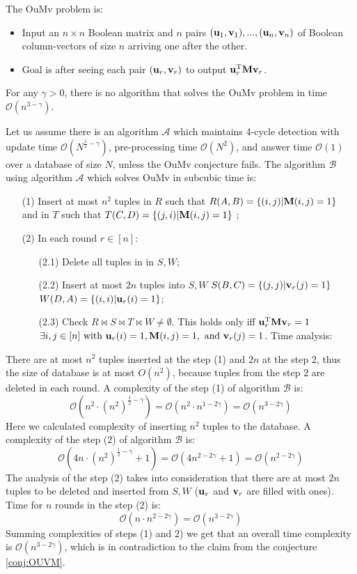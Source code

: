 \documentclass[10pt,a4paper]{article}
\begin{document}
\begin{enumerate}
The OuMv problem is:
\begin{itemize}
\item 
Input an $n \times n$ Boolean matrix  and $n$ pairs $(\textbf{\text{{u}}}_1, \textbf{\text{{v}}}_1), ..., (\textbf{\text{{u}}}_n, \textbf{\text{{v}}}_n)$ of Boolean column-vectors of size $n$ arriving one after the other. 
\item 
	Goal is after seeing each pair $(\textbf{\text{{u}}}_r, \textbf{\text{{v}}}_r)$ to output $\textbf{\text{{u}}}_r ^ \text{T}\textbf{\text{{M}}}\textbf{\text{{v}}}_r$.
\end{itemize}
\begin{conjecture}\label{conj:OUVM}
For any $\gamma > 0$, there is no algorithm that solves the OuMv problem in time $\mathcal{O}(n^{3-\gamma})$.
\end{conjecture}
Let us assume there is an algorithm $\mathcal{A}$ which maintains 4-cycle detection with update time $\mathcal{O}(N^{\frac{1}{2}-\gamma})$, pre-processing time $\mathcal{O}(N^2)$, and answer time $\mathcal{O}(1)$ over a database of size $N$, unless the OuMv conjecture fails. 
The algorithm  $\mathcal{B}$ using algorithm $\mathcal{A}$ which solves OuMv in subcubic time is:
\begin{itemize}
\item[(1)] 
Insert at most $n^2$ tuples in $R$ such that $R(A, B) = \{(i, j) | \textbf{\text{{M}}}(i, j) = 1\}$ and in $T$ such that $T(C, D) = \{(j, i) | \textbf{\text{{M}}}(i, j) = 1\}$ ;
\item[(2)] In each round $r \in [n]$:
\begin{itemize}
\item[(2.1)] Delete all tuples in in $S, W$;
\item[(2.2)]  Insert at most $2n$ tuples into $S,  W$ 
$S(B, C) = \{(j, j) | \textbf{\text{{v}}}_r(j) = 1\}$
$W(D, A) = \{(i, i) | \textbf{\text{{u}}}_r(i) = 1\}$;
\item[(2.3)] Check $R \bowtie S \bowtie T \bowtie W \neq \emptyset$. This holds only iff $\textbf{\text{{u}}} ^ \text{T}_r\textbf{\text{{M}}}\textbf{\text{{v}}}_r=1$
$
\exists i, j \in[n] \text { with } \textbf{\text{{u}}}_{r}(i)=1, \textbf{\text{{M}}}(i, j)=1, \text { and } \textbf{\text{{v}}}_{r}(j)=1
$.
Time analysis:
\end{itemize}
\end{itemize}
There are at most $n^2$ tuples inserted at the step (1) and $2n$ at the step 2, thus the size of database is at most $O(n^2)$, because tuples from the step $2$ are deleted in each round. 
A complexity of the step (1) of algorithm $\mathcal{B}$ is:
$$\mathcal{O}(n^2 \cdot (n^2)^{\frac{1}{2} -\gamma}) =
\mathcal{O}(n^2 \cdot n^{1- 2 \gamma }) = \mathcal{O}(n^{3-2\gamma})$$
Here we calculated complexity of inserting $n^2$  tuples to the database.  
A complexity of the step (2) of algorithm $\mathcal{B}$ is:
$$\mathcal{O}(4n \cdot (n^2)^{\frac{1}{2} -\gamma} + 1) = \mathcal{O}(4 n^{2-2\gamma} + 1 ) = \mathcal{O}(n^{2-2\gamma})$$
The analysis of the step (2) takes into consideration that there are at most $2n$  tuples to be deleted and inserted from $S, W$ ($\textbf{\text{{u}}}_r$ and $\textbf{\text{{v}}}_r$ are filled with ones).
Time for $n$ rounds in the step (2) is:
$$\mathcal{O}(n \cdot n^{2-2\gamma})=\mathcal{O}(n^{3-2\gamma})$$ 
Summing complexities of steps (1) and 2) we get that an overall time complexity is $\mathcal{O}(n^{3-2\gamma})$, which is in contradiction to the claim from the conjecture \ref{conj:OUVM}. 


\end{enumerate}
\end{document}
